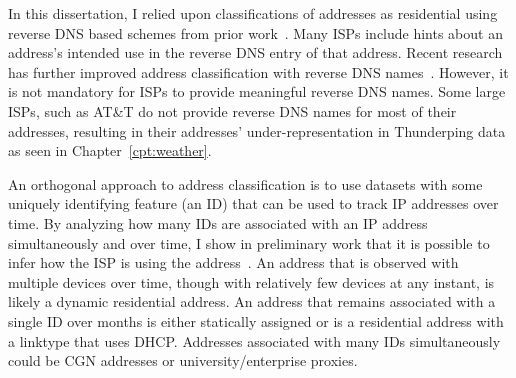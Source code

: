 In this dissertation, I relied upon classifications of addresses as
residential using reverse DNS based schemes from prior
work~\cite{pingin}. Many ISPs include hints about an address's
intended use in
the reverse DNS entry of that address. Recent research has further improved address
classification with reverse DNS names~\cite{youndo-rdns}. However,
it is not mandatory for ISPs to provide meaningful reverse DNS
names. Some large ISPs, such as AT\&T do not provide reverse DNS names
for most of their addresses, resulting in their addresses' under-representation in
Thunderping data as seen in Chapter~\ref{cpt:weather}.

An orthogonal approach to address classification is to use datasets with some uniquely identifying feature (an ID) that can be used to track IP addresses over time. By analyzing how many IDs are associated with an IP address simultaneously and over time, I show in preliminary work that it is possible to infer how the ISP is using the address~\cite{shared-addrs-apnic-blog, shared-addrs-aims}. An address that is observed with multiple devices over time, though with relatively few devices at any instant, is likely a dynamic residential address.  An address that remains associated with a single ID over months is either statically assigned or is a residential address with a linktype that uses DHCP. Addresses associated with many IDs simultaneously could be CGN addresses or university/enterprise proxies.










